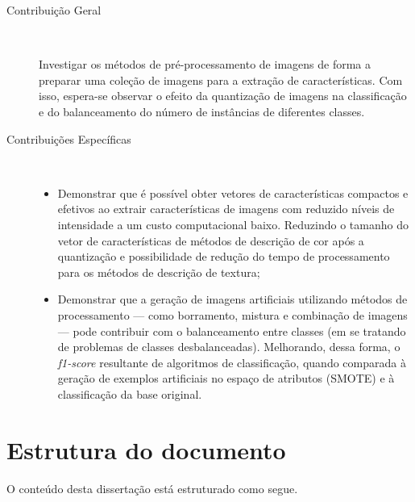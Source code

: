 \begin{description}
\item[Contribuição Geral] \

Investigar os métodos de pré-processamento de imagens de forma a preparar uma coleção de imagens para a extração de características. Com isso, espera-se observar o efeito da quantização de imagens na classificação e do balanceamento do número de instâncias de diferentes classes.

\item[Contribuições Específicas] \

  \begin{itemize}

    \item Demonstrar que é possível obter vetores de características compactos e efetivos ao extrair características de imagens com reduzido níveis de intensidade a um custo computacional baixo. Reduzindo o tamanho do vetor de características de métodos de descrição de cor após a quantização e possibilidade de redução do tempo de processamento para os métodos de descrição de textura;

    \item Demonstrar que a geração de imagens artificiais utilizando métodos de processamento --- como borramento, mistura e combinação de imagens --- pode contribuir com o balanceamento entre classes (em se tratando de problemas de classes desbalanceadas). Melhorando, dessa forma, o \textit{f1-score} resultante de algoritmos de classificação, quando comparada à geração de exemplos artificiais no espaço de atributos (SMOTE) e à classificação da base original.

  \end{itemize}
\end{description}

\section{Estrutura do documento}

O conteúdo desta dissertação está estruturado como segue.

